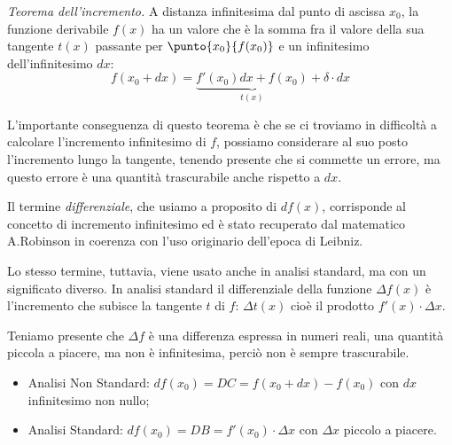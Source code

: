 \begin{teorema}
\label{teo:inc}
\emph{Teorema dell'incremento.} A distanza infinitesima dal punto di 
ascissa \(x_0\), la funzione derivabile \(f(x)\) ha un valore che è la 
somma fra il valore della sua tangente \(t(x)\) passante per 
\(\punto{x_0}{f(x_0)}\) e un infinitesimo dell'infinitesimo \(dx\):
\[f(x_0+dx)=\underbrace{f'(x_0)dx+f(x_0)}_{t(x)}+\delta\cdot dx\]
\end{teorema}
L'importante conseguenza di questo teorema è che se ci troviamo in 
difficoltà a calcolare l'incremento infinitesimo di 
\(f\), possiamo considerare al suo posto l'incremento lungo la 
tangente, tenendo presente che si commette un errore, ma questo errore 
è una quantità trascurabile anche rispetto a \(dx\).

\begin{osservazione}
Il termine \emph{differenziale}, che usiamo a proposito di 
\(df(x)\), corrisponde al concetto di incremento infinitesimo ed è 
stato recuperato dal matematico A.Robinson in coerenza con l'uso 
originario dell'epoca di Leibniz. 

Lo stesso termine, tuttavia, viene usato anche in analisi standard, ma con un 
significato diverso. 
In analisi standard il differenziale della funzione \(\Delta f(x)\) 
è l'incremento che subisce la tangente \(t\) di \(f\): \(\Delta t(x)\)
cioè il prodotto \(f'(x) \cdot \Delta x\).

Teniamo presente che \(\Delta f\) è una differenza espressa in numeri reali, 
una quantità piccola a piacere, ma non è infinitesima, perciò non è sempre 
trascurabile.


\label{}

\begin{itemize} [nosep]
\item Analisi Non Standard: \(df(x_0) = DC = f(x_0 + dx) - f(x_0)\) 
con \(dx\) infinitesimo non nullo;
\item Analisi Standard: \(df(x_0) = DB = f'(x_0) \cdot \Delta x\) 
con \(\Delta x\) piccolo a piacere.
\end{itemize}

\end{osservazione}

